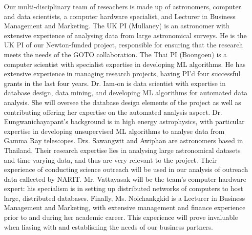 \documentclass[11pt]{article}
\begin{document}
\noindent
Our multi-disciplinary team of reseachers is made up of astronomers, computer and data scientists, a computer hardware specialist, and Lecturer in Business Management and Marketing. The UK PI (Mullaney) is an astronomer with extensive experience of analysing data from large astronomical surveys. He is the UK PI of our Newton-funded project, responsible for ensuring that the research meets the needs of the GOTO collaboration. The Thai PI (Boongoen) is a computer scientist with specialist expertise in developing ML algorithms. He has extensive experience in managing research projects, having PI'd four successful grants in the last four years. Dr. Iam-on is data scientist with expertise in database design, data mining, and developing ML algorithms for automated data analysis. She will oversee the database design elements of the project as well as contributing offering her expertise on the automated analysis aspect. Dr. Eungwanichayapant's background is in high energy astrophysics, with particular expertise in developing unsupervised ML algorithms to analyse data from Gamma Ray telescopes. Drs. Sawangwit and Awiphan are astronomers based in Thailand. Their research expertise lies in analysing large astronomical datasets and time varying data, and thus are very relevant to the project. Their experience of conducting science outreach will be used in our analysis of outreach data callected by NARIT. Mr. Vattayasak will be the team's computer hardware expert: his specialism is in setting up distributed networks of computers to host large, distributed databases. Finally, Ms. Noichankgkid is a Lecturer in Business Management and Marketing, with extensive management and finance experience prior to and during her academic career. This experience will prove invaluable when liasing with and establishing the needs of our business partners. 
\end{document}
